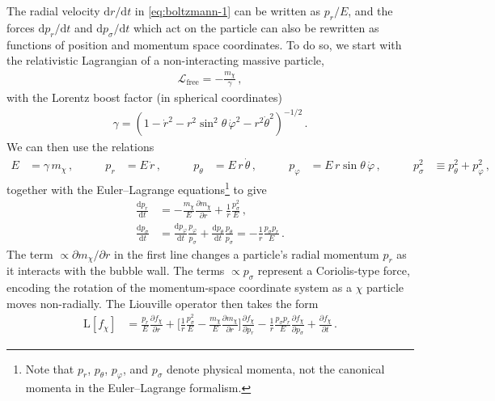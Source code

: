 \documentclass[
onecolumn, %
11pt, %
tightenlines,
superscriptaddress, %
nofootinbib, %
preprintnumbers, %
prd %
]{revtex4-1}
\newcommand{\pd}[2]{\frac{\partial #1}{\partial #2}}                  %
\newcommand{\pdtext}[2]{{\partial #1} / {\partial #2}}                %
\newcommand{\td}[2]{\frac{\mathrm d #1}{\mathrm d #2}}                %
\newcommand{\tdtext}[2]{{\mathrm d #1}/ {\mathrm d #2}}               %
\newcommand{\bb}[1]{\bigg[#1\bigg]}                                   %
\newcommand{\f}{\ensuremath{f_\chi}\xspace}
\begin{document}
The radial velocity $\tdtext{r}{t}$ in \cref{eq:boltzmann-1} can be written as $p_r / E$, and the forces $\tdtext{p_r}{t}$ and $\tdtext{p_\sigma}{t}$ which act on the particle can also be rewritten as functions of position and momentum space coordinates. To do so, we start with the relativistic Lagrangian of a non-interacting massive particle,
%
\begin{align}
	\mathcal{L}_\text{free} = - \frac{m_\chi}{\gamma} \,,
\end{align}
%
with the Lorentz boost factor (in spherical coordinates)
%
\begin{align}
	\gamma = (1 - \dot r^2 - r^2{\sin^2}\theta \,\dot \varphi^2-r^2 \dot\theta^2)^{-1/2} \,.
	\label{eq:lorentz-factor}
\end{align}
%
We can then use the relations
%
\begin{align}
	E          &= \gamma \, m_\chi \,,                   &\qquad
	p_r        &= E \, \dot r \,,                        &\qquad
	p_\theta   &= E \,r \,\dot \theta \,,                &\qquad
	p_\varphi  &= E \,r  \sin{\theta} \, \dot\varphi \,, &\qquad
	p_\sigma^2 &\equiv p_{\theta}^2 + p_{\varphi}^2 \,,
	\label{eq:energy-momentum-definitions}
\end{align}
%
together with the Euler--Lagrange equations\footnote{Note that $p_r$, $p_\theta$, $p_\varphi$, and $p_\sigma$ denote physical momenta, not the canonical momenta in the Euler--Lagrange formalism.} to give
%
\begin{align}
    \td{p_r}{t} &= - \frac{m_\chi}{E} \pd{m_\chi}{r} + \frac{1}{r} \frac{p_\sigma^2}{E} \,,
                                                \label{eq:dprdt} \\
    \td{p_\sigma}{t}
        &= \td{p_\varphi}{t} \frac{p_\varphi}{p_\sigma} + \td{p_\theta}{t} \frac{p_\theta}{p_\sigma}
        = -\frac{1}{r} \frac{p_\sigma p_r}{E}\,.
    \label{eq:dpsigmadt}
\end{align}
%
The term $\propto \pdtext{m_\chi}{r}$ in the first line changes a particle's radial momentum $p_r$ as it interacts with the bubble wall.  The terms $\propto p_\sigma$ represent a Coriolis-type force, encoding the rotation of the momentum-space coordinate system as a $\chi$ particle moves non-radially.  The Liouville operator then takes the form
%
\begin{align}
	\boldsymbol{\mathrm L}[\f] &=
	    \frac{p_r}{E}\pd{\f}{r}
	  + \bb{ \frac{1}{r}\frac{p_\sigma^2}{E} - \frac{m_\chi}{E}\pd{m_\chi}{r}
	   } \pd{\f}{p_r}
	  - \frac{1}{r} \frac{p_\sigma p_r}{E} \pd{\f}{p_\sigma}
	  + \pd{\f}{t} \,.
    \label{eq:liouville-1}
\end{align}
\end{document}
